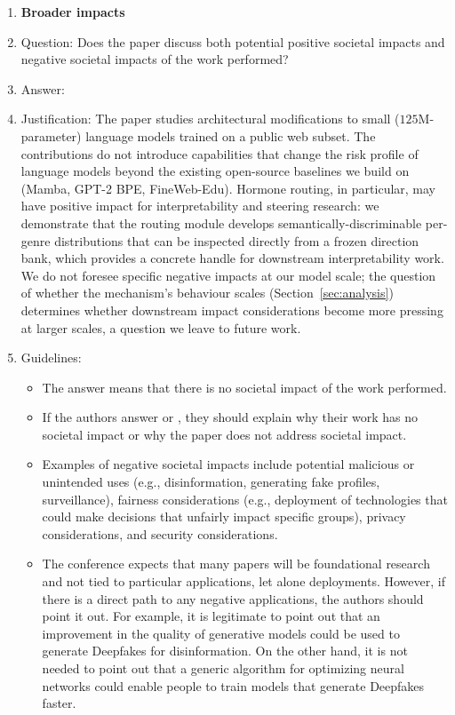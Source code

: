\begin{enumerate}
\item {\bf Broader impacts}
    \item[] Question: Does the paper discuss both potential positive societal impacts and negative societal impacts of the work performed?
    \item[] Answer: \answerYes{}
    \item[] Justification: The paper studies architectural modifications to small ($125$M-parameter) language models trained on a public web subset. The contributions do not introduce capabilities that change the risk profile of language models beyond the existing open-source baselines we build on (Mamba, GPT-2 BPE, FineWeb-Edu). Hormone routing, in particular, may have positive impact for interpretability and steering research: we demonstrate that the routing module develops semantically-discriminable per-genre distributions that can be inspected directly from a frozen direction bank, which provides a concrete handle for downstream interpretability work. We do not foresee specific negative impacts at our model scale; the question of whether the mechanism's behaviour scales (Section~\ref{sec:analysis}) determines whether downstream impact considerations become more pressing at larger scales, a question we leave to future work.
    \item[] Guidelines:
    \begin{itemize}
        \item The answer \answerNA{} means that there is no societal impact of the work performed.
        \item If the authors answer \answerNA{} or \answerNo, they should explain why their work has no societal impact or why the paper does not address societal impact.
        \item Examples of negative societal impacts include potential malicious or unintended uses (e.g., disinformation, generating fake profiles, surveillance), fairness considerations (e.g., deployment of technologies that could make decisions that unfairly impact specific groups), privacy considerations, and security considerations.
        \item The conference expects that many papers will be foundational research and not tied to particular applications, let alone deployments. However, if there is a direct path to any negative applications, the authors should point it out. For example, it is legitimate to point out that an improvement in the quality of generative models could be used to generate Deepfakes for disinformation. On the other hand, it is not needed to point out that a generic algorithm for optimizing neural networks could enable people to train models that generate Deepfakes faster.

\end{itemize}
\end{enumerate}

